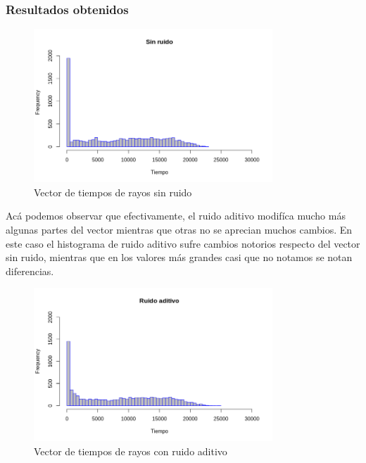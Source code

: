 \subsubsection*{Resultados obtenidos}



\begin{figure}[H]
	\centering	\includegraphics[width=0.8\textwidth]{img/sinRuido.png}
	\caption{Vector de tiempos de rayos sin ruido}
	\label{fig:etiqueta}
\end{figure}
\par Acá podemos observar que efectivamente, el ruido aditivo modifíca mucho más algunas partes del vector mientras que otras no se aprecian muchos cambios. En este caso el histograma de ruido aditivo sufre cambios notorios respecto del vector sin ruido, mientras que en los valores más grandes casi que no notamos se notan diferencias.

\begin{figure}[H]
	\centering	\includegraphics[width=0.8\textwidth]{img/ruidoAditivo.png}
	\caption{Vector de tiempos de rayos con ruido aditivo}
	\label{fig:etiqueta}
\end{figure}

